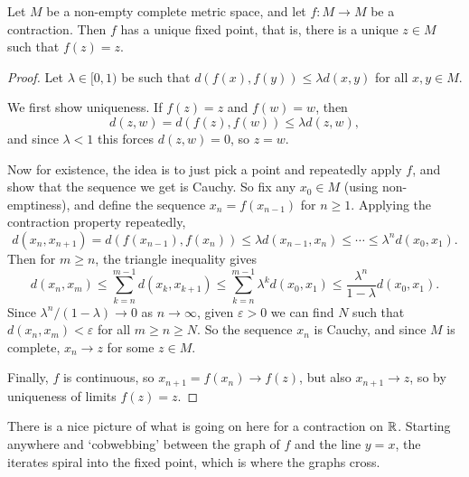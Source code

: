 \documentclass[a4paper]{scrartcl}
\begin{document}
\begin{theorem}\label{thm:contraction}
    Let $M$ be a non-empty complete metric space, and let $f: M \rightarrow M$ be a contraction. Then $f$ has a unique fixed point, that is, there is a unique $z \in M$ such that $f(z) = z$.
\end{theorem}
\begin{proof}
    Let $\lambda \in [0, 1)$ be such that $d(f(x), f(y)) \leq \lambda d(x, y)$ for all $x, y \in M$.

    We first show uniqueness. If $f(z) = z$ and $f(w) = w$, then
    $$
    d(z, w) = d(f(z), f(w)) \leq \lambda d(z, w),
    $$
    and since $\lambda < 1$ this forces $d(z, w) = 0$, so $z = w$.

    Now for existence, the idea is to just pick a point and repeatedly apply $f$, and show that the sequence we get is Cauchy. So fix any $x_0 \in M$ (using non-emptiness), and define the sequence $x_n = f(x_{n - 1})$ for $n \geq 1$. Applying the contraction property repeatedly,
    $$
    d(x_n, x_{n + 1}) = d(f(x_{n-1}), f(x_n)) \leq \lambda d(x_{n - 1}, x_n) \leq \cdots \leq \lambda^n d(x_0, x_1).
    $$
    Then for $m \geq n$, the triangle inequality gives
    $$
    d(x_n, x_m) \leq \sum_{k = n}^{m - 1} d(x_k, x_{k + 1}) \leq \sum_{k = n}^{m - 1} \lambda^k d(x_0, x_1) \leq \frac{\lambda^n}{1 - \lambda} d(x_0, x_1).
    $$
    Since $\lambda^n/(1 - \lambda) \rightarrow 0$ as $n \rightarrow \infty$, given $\varepsilon > 0$ we can find $N$ such that $d(x_n, x_m) < \varepsilon$ for all $m \geq n \geq N$. So the sequence $x_n$ is Cauchy, and since $M$ is complete, $x_n \rightarrow z$ for some $z \in M$.

    Finally, $f$ is continuous, so $x_{n + 1} = f(x_n) \rightarrow f(z)$, but also $x_{n + 1} \rightarrow z$, so by uniqueness of limits $f(z) = z$.
\end{proof}

There is a nice picture of what is going on here for a contraction on $\mathbb{R}$. Starting anywhere and `cobwebbing' between the graph of $f$ and the line $y = x$, the iterates spiral into the fixed point, which is where the graphs cross.
\end{document}
